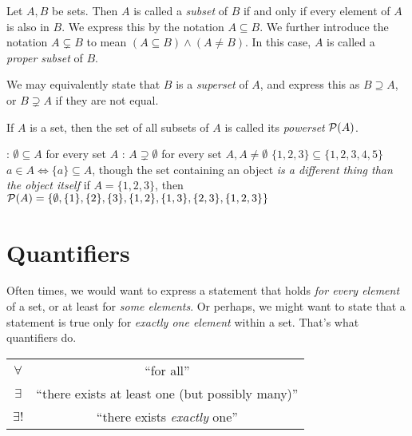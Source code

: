 Let \(A, B\) be sets. Then \(A\) is called a \emph{subset} of \(B\) if and only if
every element of \(A\) is also in \(B\). We express this by the notation
\(A \subseteq B\). We further introduce the notation \(A \subsetneq B\) to mean
\((A \subseteq B) \land (A \neq B)\). In this case, \(A\) is called a \emph{proper
  subset} of \(B\).

We may equivalently state that \(B\) is a \emph{superset} of \(A\), and express
this as \(B \supseteq A\), or \(B \supsetneq A\) if they are not equal.

If \(A\) is a set, then the set of all subsets of \(A\) is called its
\emph{powerset} \(\mathcal{P}(A)\).

\begin{example}
  \begin{itemize}
    \leavevmode
    :
          \(\emptyset \subseteq A\) for every set \(A\)
    :
          \(A \supsetneq \emptyset\) for every set \(A, A \neq \emptyset\)
    \ii{} \(\{1,2,3\} \subseteq \{1,2,3,4,5\}\)
    \ii{} \(a \in A \Leftrightarrow \{a\} \subseteq A\), though the set containing an object \emph{is a
          different thing than the object itself}
    \ii{} if \(A = \{1,2,3\}\), then
          \(\mathcal{P}(A) = \{\emptyset, \{1\}, \{2\}, \{3\}, \{1,2\}, \{1,3\}, \{2,3\}, \{1,2,3\}\}\)
  \end{itemize}
\end{example}

\section{Quantifiers}

Often times, we would want to express a statement that holds \emph{for every
  element} of a set, or at least for \emph{some elements}.
Or perhaps, we might want to state that a statement is true only for
 \emph{exactly one element} within a set. That's what quantifiers do.

\begin{tcolorbox}[colframe=gray!80, colback=white, boxrule=0.4pt, top=4pt, bottom=4pt]
  \begin{minipage}[t]{\textwidth}
    \centering
    \vspace{-10pt}
    \vspace{3pt}
    \begin{tabular}{cc}
      \(\forall\) & ``for all''\\
      \(\exists\) & ``there exists at least one (but possibly many)''\\
      \(\exists!\) & ``there exists \emph{exactly} one''
    \end{tabular}
  \end{minipage}
\end{tcolorbox}

